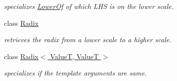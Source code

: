 \begin{DoxyCompactItemize}
\begin{DoxyCompactList}\small\item\em specializes \hyperlink{classhryky_1_1scale_1_1_lower_of}{Lower\-Of} of which L\-H\-S is on the lower scale. \end{DoxyCompactList}\item 
class \hyperlink{classhryky_1_1scale_1_1_radix}{Radix}
\begin{DoxyCompactList}\small\item\em retrieves the radix from a lower scale to a higher scale. \end{DoxyCompactList}\item 
class \hyperlink{classhryky_1_1scale_1_1_radix_3_01_value_t_00_01_value_t_01_4}{Radix$<$ Value\-T, Value\-T $>$}
\begin{DoxyCompactList}\small\item\em specializes if the template arguments are same. \end{DoxyCompactList}\end{DoxyCompactItemize}
